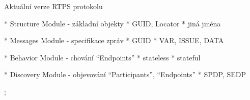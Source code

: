 \sec Aktuální verze RTPS protokolu

* Structure Module - základní objekty
\begitems
* GUID, Locator
* jiná jména
\enditems

* Messages Module - specifikace zpráv
\begitems
* GUID
* VAR, ISSUE, DATA
\enditems

* Behavior Module - chování ``Endpoints''
\begitems
* stateless
* stateful
\enditems

* Discovery Module - objevování ``Participants'', ``Endpoints''
\begitems
* SPDP, SEDP
\enditems

\pg;
